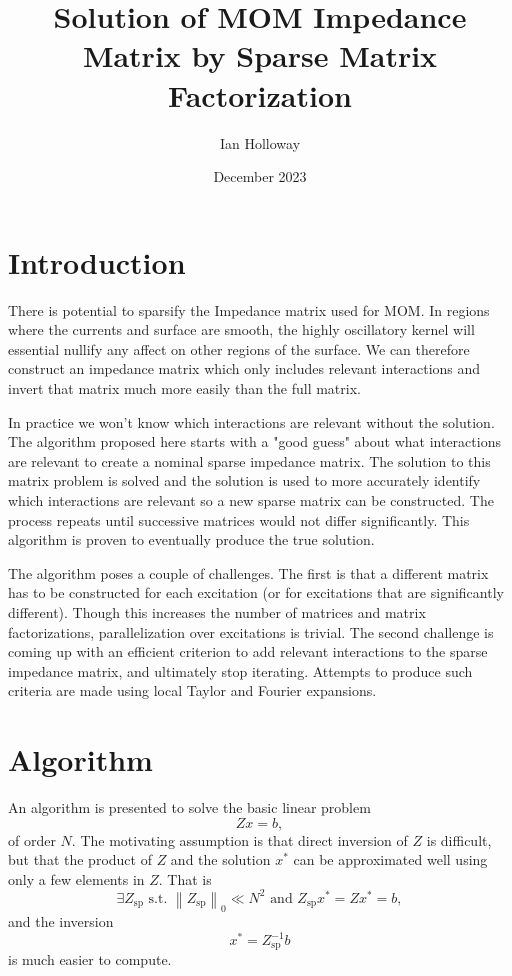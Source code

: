 \documentclass{article}
\title{Solution of MOM Impedance Matrix by Sparse Matrix Factorization}
\author{Ian Holloway}
\date{December 2023}
\newcommand{\norm}[1]{\left\lVert #1 \right\rVert}
\theoremstyle{plain}
\begin{document}
\maketitle

\section{Introduction}\label{sec_intro}

There is potential to sparsify the Impedance matrix used for MOM.
In regions where the currents and surface are smooth, the highly oscillatory kernel will essential nullify any affect on other regions of the surface.
We can therefore construct an impedance matrix which only includes relevant interactions and invert that matrix much more easily than the full matrix.

In practice we won't know which interactions are relevant without the solution.
The algorithm proposed here starts with a "good guess" about what interactions are relevant to create a nominal sparse impedance matrix.
The solution to this matrix problem is solved and the solution is used to more accurately identify which interactions are relevant so a new sparse matrix can be constructed.
The process repeats until successive matrices would not differ significantly. This algorithm is proven to eventually produce the true solution.

The algorithm poses a couple of challenges.
The first is that a different matrix has to be constructed for each excitation (or for excitations that are significantly different).
Though this increases the number of matrices and matrix factorizations, parallelization over excitations is trivial.
The second challenge is coming up with an efficient criterion to add relevant interactions to the sparse impedance matrix, and ultimately stop iterating.
Attempts to produce such criteria are made using local Taylor and Fourier expansions.


\section{Algorithm}\label{sec_algo}


An algorithm is presented to solve the basic linear problem
\begin{equation}\label{eq_zxb}
	Zx=b,
\end{equation}
of order $N$.
The motivating assumption is that direct inversion of $Z$ is difficult,
but that the product of $Z$ and the solution $x^*$ can be approximated well using only a few elements in $Z$.
That is
\begin{equation}
	\exists Z_{\text{sp}} \text{ s.t. } \norm{Z_\text{sp}}_0 \ll N^2 \text{ and } Z_{\text{sp}} x^* = Zx^*= b,
\end{equation}
and the inversion
\begin{equation}
	x^* = Z_{\text{sp}}^{-1}b
\end{equation}
is much easier to compute.
\end{document}
